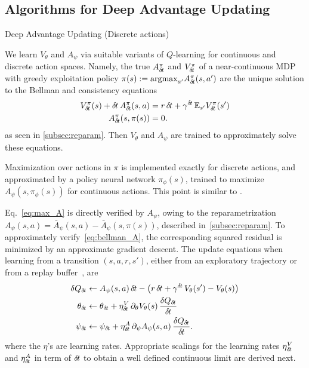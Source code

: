 \subsection{Algorithms for Deep Advantage Updating}
\label{subsec:algorithm}
\begin{algorithm}[ht]
  \caption{Deep Advantage Updating (Discrete actions)}
  \label{alg:dau}
	
\end{algorithm}

We learn $V_{\theta}$ and $A_{\psi}$ via suitable variants of $Q$-learning for continuous and
discrete action spaces. Namely, 
the true $A^\pi_{\delta\hspace{-.1em}t}$
and $V^\pi_{\delta\hspace{-.1em}t}$ of a near-continuous MDP with greedy exploitation
policy $\pi(s) \mathrel{\mathop{:}}=
\text{argmax}_{a'}A^\pi_{\delta\hspace{-.1em}t}(s, a')$
are the unique solution to the Bellman and consistency equations
\begin{align}
	V^{\pi}_{\delta\hspace{-.1em}t}(s) + {\delta\hspace{-.1em}t}\, A^{\pi}_{\delta\hspace{-.1em}t}(s, a) &=
	r\,{\delta\hspace{-.1em}t} + \gamma^{{\delta\hspace{-.1em}t}}  \,\mathbb{E}_{s'} V^{\pi}_{\delta\hspace{-.1em}t}(s')\label{eq:bellman_A}\\
	A^{\pi}_{\delta\hspace{-.1em}t}(s, \pi(s)) &= 0\label{eq:max_A}.
\end{align}
as seen in \ref{subsec:reparam}. Then $V_{\theta}$
and $A_{\psi}$ are trained to approximately solve these equations.

Maximization over actions in $\pi$ is implemented exactly for discrete actions,
and approximated by a policy neural network $\pi_\phi(s)$, trained to maximize $A_\psi(s,
\pi_\phi(s))$ for continuous actions. This point is similar to
\cite{ddpg}.

Eq.~\eqref{eq:max_A}
is directly verified by $A_{\psi}$, owing to the reparametrization
$A_\psi(s, a) = \bar{A}_\psi(s, a) - \bar{A}_\psi(s, \pi(s))$, described
in~\ref{subsec:reparam}.  To approximately verify~\eqref{eq:bellman_A}, the
corresponding squared residual is minimized by an approximate gradient descent.
The update equations when learning from a transition $(s, a, r, s')$, either from
an exploratory trajectory or from a replay buffer~\cite{dqn}, are
\begin{align}
	\delta Q_{\delta\hspace{-.1em}t} &\leftarrow A_\psi(s, a)\, {\delta\hspace{-.1em}t} - \left(r
	\,{\delta\hspace{-.1em}t} + \gamma^{{\delta\hspace{-.1em}t}}\, V_\theta(s') - V_\theta(s)\right)
	\label{eq:approx_deltaQ}\\
	\theta_{\delta\hspace{-.1em}t} &\leftarrow \theta_{\delta\hspace{-.1em}t} + \eta^V_{\delta\hspace{-.1em}t}
	\,\partial_{\theta} V_\theta(s) \,\frac{\delta Q_{\delta\hspace{-.1em}t}}{{\delta\hspace{-.1em}t}}
	\label{eq:approx_bellman_V}\\
	\psi_{\delta\hspace{-.1em}t} &\leftarrow \psi_{\delta\hspace{-.1em}t} + \eta^A_{\delta\hspace{-.1em}t}
	\,\partial_{\psi} A_\psi(s, a) \,\frac{\delta Q_{\delta\hspace{-.1em}t}}{{\delta\hspace{-.1em}t}}.
	\label{eq:approx_bellman_A}
\end{align} 
where the $\eta$'s are learning rates.
Appropriate scalings for the learning rates $\eta^V_{\delta\hspace{-.1em}t}$ and
$\eta^A_{\delta\hspace{-.1em}t}$ in term of ${\delta\hspace{-.1em}t}$ to obtain a well defined continuous
limit are derived next.

